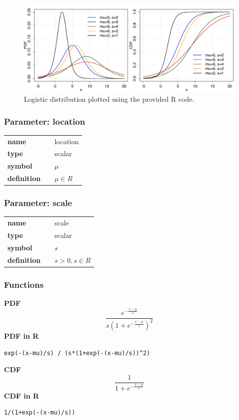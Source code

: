 \begin{figure}[ht!]
\centering
  \includegraphics[width=140mm]{pics/Logistic.pdf}
 \caption{Logistic distribution plotted using the provided R code.}
 \label{fig:Logistic}
\end{figure}

\subsubsection*{Parameter: location}

\noindent\begin{tabular}{p{2cm}cl}
\textbf{name} & & location \\
\textbf{type} & & scalar \\
\textbf{symbol} & & $\mu$  \\
\textbf{definition} & & $\mu \in R$
\end{tabular}
\subsubsection*{Parameter: scale}

\noindent\begin{tabular}{p{2cm}cl}
\textbf{name} & & scale \\
\textbf{type} & & scalar \\
\textbf{symbol} & & $s$  \\
\textbf{definition} & & $s > 0, s \in R$
\end{tabular}
\subsubsection*{Functions}

\smallskip \noindent \hspace{.2cm} \textbf{PDF} 
\begin{equation*}\frac{e^{-\frac{x-\mu}{s}}} {s\left(1+e^{-\frac{x-\mu}{s}}\right)^2}\end{equation*}
\smallskip \noindent \hspace{.2cm} \textbf{PDF in R}  
\begin{verbatim}exp(-(x-mu)/s) / (s*(1+exp(-(x-mu)/s))^2)\end{verbatim}
\smallskip \noindent \hspace{.2cm} \textbf{CDF} 
\begin{equation*}\frac{1}{1+e^{-\frac{x-\mu}{s}}}\end{equation*}
\smallskip \noindent \hspace{.2cm} \textbf{CDF in R} 
\begin{verbatim}1/(1+exp(-(x-mu)/s))\end{verbatim}
\smallskip
